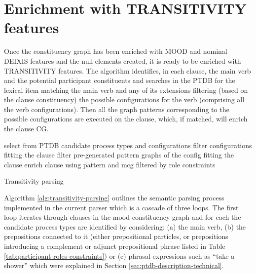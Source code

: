 \section{Enrichment with TRANSITIVITY features}
\label{sec:semantic-parsing}

    Once the constituency graph has been enriched with MOOD and nominal DEIXIS features and the null elements created, it is ready to be enriched with TRANSITIVITY features. The algorithm identifies, in each clause, the main verb and the potential participant constituents and searches in the PTDB for the lexical item matching the main verb and any of its extensions filtering (based on the clause constituency) the possible configurations for the verb (comprising all the verb configurations). Then all the graph patterns corresponding to the possible configurations are executed on the clause, which, if matched, will enrich the clause CG. 

    \begin{algorithm}[!ht]
        \Input { \cg, \dg }
        \Begin
        {
            {
                select from PTDB candidate process types and configurations\;
                filter configurations fitting the clause \;
                {
                    filter pre-generated pattern graphs of the config fitting the clause\;
                    {
                        \label{line:enrich-from-pattern} enrich clause using pattern and mcg filtered by role constraints\;
                    }
                }
            }
        }
        \caption{Transitivity parsing}
        \label{alg:transitivity-parsing}
    \end{algorithm}

    Algorithm \ref{alg:transitivity-parsing} outlines the semantic parsing process implemented in the current parser which is a cascade of three loops. The first loop iterates through clauses in the mood constituency graph and for each the candidate process types are identified by considering: (a) the main verb, (b) the prepositions connected to it (either prepositional particles, or prepositions introducing a complement or adjunct prepositional phrase listed in Table \ref{tab:participant-roles-constraints}) or (c) phrasal expressions such as ``take a shower'' which were explained in Section \ref{sec:ptdb-description-technical}.

